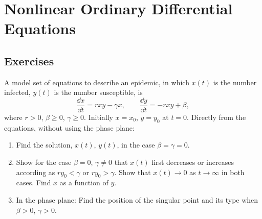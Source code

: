 \flushbottom






\chapter{Nonlinear Ordinary Differential Equations}












\raggedbottom
\pagebreak
\flushbottom
\section{Exercises}




\begin{Exercise}
  A model set of equations to describe an epidemic, in which 
  $x(t)$ is the
  number infected, $y(t)$ is the number susceptible, is
  \[ 
  \frac{\dd x}{\dd t} = r x y - \gamma x, 
  \qquad \frac{\dd y}{\dd t} = - r x y + \beta, 
  \]
  where $r > 0$, $\beta \geq 0$, 
  $\gamma \geq 0$.  Initially $x = x_0$, 
  $y = y_0$ at $t = 0$.
  Directly from the equations, without using the phase plane:
  \begin{enumerate}
  \item
    Find the solution, $x(t)$, $y(t)$, in the case 
    $\beta = \gamma = 0$.
  \item
    Show for the case $\beta = 0$, $\gamma \neq 0$ 
    that $x(t)$ first decreases
    or increases according as $r y_0 < \gamma$ or 
    $r y_0 > \gamma$.
    Show that $x(t) \to 0$ as $t \to \infty$ in both cases.
    Find $x$ as a function of $y$.
  \item
    In the phase plane:
    Find the position of the singular point and its type when
    $\beta > 0$, $\gamma > 0$.
  \end{enumerate}
\end{Exercise}


